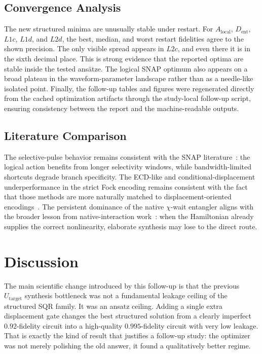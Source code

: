 \documentclass[11pt, a4paper]{article}
\begin{document}
\subsection{Convergence Analysis}

The new structured minima are unusually stable under restart. For $A_{\mathrm{local}}$, $D_{\mathrm{ent}}$, $L1c$, $L1d$, and $L2d$, the best, median, and worst restart fidelities agree to the shown precision. The only visible spread appears in $L2c$, and even there it is in the sixth decimal place. This is strong evidence that the reported optima are stable inside the tested ans\"atze. The logical SNAP optimum also appears on a broad plateau in the waveform-parameter landscape rather than as a needle-like isolated point. Finally, the follow-up tables and figures were regenerated directly from the cached optimization artifacts through the study-local follow-up script, ensuring consistency between the report and the machine-readable outputs.

\subsection{Literature Comparison}

The selective-pulse behavior remains consistent with the SNAP literature~\cite{heeres2015snap,krastanov2015universal,heeres2017logical}: the logical action benefits from longer selectivity windows, while bandwidth-limited shortcuts degrade branch specificity. The ECD-like and conditional-displacement underperformance in the strict Fock encoding remains consistent with the fact that those methods are more naturally matched to displacement-oriented encodings~\cite{eickbusch2022ecd,diringer2024cnod}. The persistent dominance of the native $\chi$-wait entangler aligns with the broader lesson from native-interaction work~\cite{yang2024nativecubic}: when the Hamiltonian already supplies the correct nonlinearity, elaborate synthesis may lose to the direct route.

\section{Discussion}
\label{sec:discussion}

The main scientific change introduced by this follow-up is that the previous $U_{\mathrm{target}}$ synthesis bottleneck was not a fundamental leakage ceiling of the structured SQR family. It was an ansatz ceiling. Adding a single extra displacement gate changes the best structured solution from a clearly imperfect $0.92$-fidelity circuit into a high-quality $0.995$-fidelity circuit with very low leakage. That is exactly the kind of result that justifies a follow-up study: the optimizer was not merely polishing the old answer, it found a qualitatively better regime.
\end{document}
